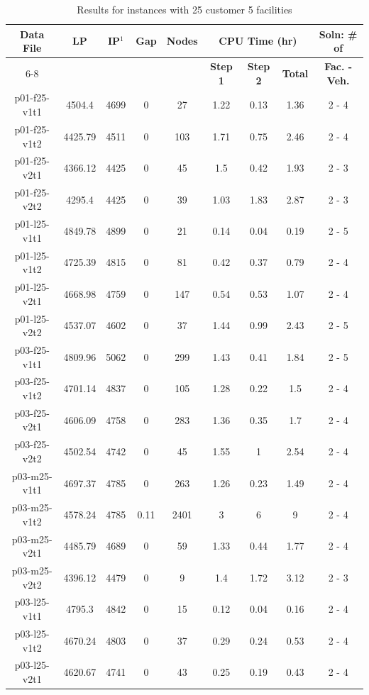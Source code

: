 \newpage
\begin{table}[h!tbp]
\centering
\caption{Results for instances with 25 customer 5 facilities}\label{25Cust_res}
\begin {tabular}[t]{|c|c|c|c|c|c|c|c|c|}  
\hline
{\bf Data File} & {\bf LP} & {\bf IP$^1$} & {\bf Gap} & {\bf Nodes} & \multicolumn{3}{|c|}{\bf CPU Time (hr)} & {\bf Soln: \# of} \\\cline{6-8}  
\mbox{} & \mbox{} & \mbox{} & \mbox{} & \mbox{} &  {\bf Step 1 } & {\bf Step 2} & {\bf Total} & {\bf Fac. - Veh. } \\\hline
p01-f25-v1t1	&	4504.4	&	4699	&	0	&	27	&	1.22	&	0.13	&	1.36	&	2	-	4	\\
p01-f25-v1t2	&	4425.79	&	4511	&	0	&	103	&	1.71	&	0.75	&	2.46	&	2	-	4	\\
p01-f25-v2t1	&	4366.12	&	4425	&	0	&	45	&	1.5	&	0.42	&	1.93	&	2	-	3	\\
p01-f25-v2t2	&	4295.4	&	4425	&	0	&	39	&	1.03	&	1.83	&	2.87	&	2	-	3	\\
p01-l25-v1t1	&	4849.78	&	4899	&	0	&	21	&	0.14	&	0.04	&	0.19	&	2	-	5	\\
p01-l25-v1t2	&	4725.39	&	4815	&	0	&	81	&	0.42	&	0.37	&	0.79	&	2	-	4	\\
p01-l25-v2t1	&	4668.98	&	4759	&	0	&	147	&	0.54	&	0.53	&	1.07	&	2	-	4	\\
p01-l25-v2t2	&	4537.07	&	4602	&	0	&	37	&	1.44	&	0.99	&	2.43	&	2	-	5	\\
p03-f25-v1t1	&	4809.96	&	5062	&	0	&	299	&	1.43	&	0.41	&	1.84	&	2	-	5	\\
p03-f25-v1t2	&	4701.14	&	4837	&	0	&	105	&	1.28	&	0.22	&	1.5	&	2	-	4	\\
p03-f25-v2t1	&	4606.09	&	4758	&	0	&	283	&	1.36	&	0.35	&	1.7	&	2	-	4	\\
p03-f25-v2t2	&	4502.54	&	4742	&	0	&	45	&	1.55	&	1	&	2.54	&	2	-	4	\\
p03-m25-v1t1	&	4697.37	&	4785	&	0	&	263	&	1.26	&	0.23	&	1.49	&	2	-	4	\\
p03-m25-v1t2	& 4578.24	&	4785	&	0.11	&	2401	&	3	&	6	&	9	&	2	-	4	\\
p03-m25-v2t1	&	4485.79	&	4689	&	0	&	59	&	1.33	&	0.44	&	1.77	&	2	-	4	\\
p03-m25-v2t2	&	4396.12	&	4479	&	0	&	9	&	1.4	&	1.72	&	3.12	&	2	-	3	\\
p03-l25-v1t1	&	4795.3	&	4842	&	0	&	15	&	0.12	&	0.04	&	0.16	&	2	-	4	\\
p03-l25-v1t2	&	4670.24	&	4803	&	0	&	37	&	0.29	&	0.24	&	0.53	&	2	-	4	\\
p03-l25-v2t1	&	4620.67	&	4741	&	0	&	43	&	0.25	&	0.19	&	0.43	&	2	-	4	\\

\end{tabular}
\end{table}
